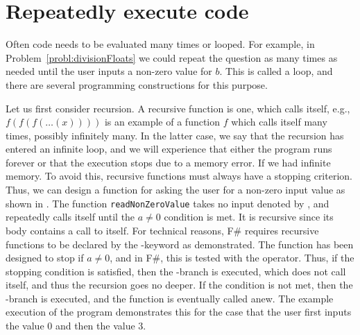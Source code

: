 \documentclass[springer.tex]{subfiles}
\begin{document}
\section{Repeatedly execute code}
Often code needs to be evaluated many times or looped. For example, in Problem~\ref{probl:divisionFloats} we could repeat the question as many times as needed until the user inputs a non-zero value for $b$. This is called a loop, and there are several programming constructions for this purpose.

Let us first consider recursion. A recursive function is one, which calls itself, e.g., $f(f(f(\dots(x))))$ is an example of a function $f$ which calls itself many times, possibly infinitely many. In the latter case, we say that the recursion has entered an infinite loop, and we will experience that either the program runs forever or that the execution stops due to a memory error. If we had infinite memory. To avoid this, recursive functions must always have a stopping criterion. Thus, we can design a function for asking the user for a non-zero input value as shown in .
% 
%
The function \lstinline{readNonZeroValue} takes no input denoted by \lexeme{()}, and repeatedly calls itself until the $a\neq 0$ condition is met. It is recursive since its body contains a call to itself. For technical reasons, F\# requires recursive functions to be declared by the -keyword as demonstrated. The function has been designed to stop if $a\neq 0$, and in F\#, this is tested with the \lexeme{<>} operator. Thus, if the stopping condition is satisfied, then the -branch is executed, which does not call itself, and thus the recursion goes no deeper. If the condition is not met, then the -branch is executed, and the function is eventually called anew. The example execution of the program demonstrates this for the case that the user first inputs the value 0 and then the value 3.
\end{document}
